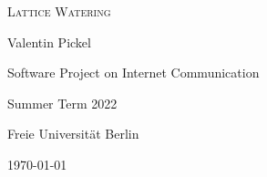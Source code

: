 \documentclass[10pt, a4paper]{article}
\begin{document}
    \begin{center}
        \textsc{Lattice Watering}

        \vspace{\baselineskip}

        Valentin Pickel

        \vspace{\baselineskip}

        Software Project on Internet Communication
        
        Summer Term 2022

        Freie Universität Berlin

        \vspace{\baselineskip}

        \today
    \end{center}
\end{document}
